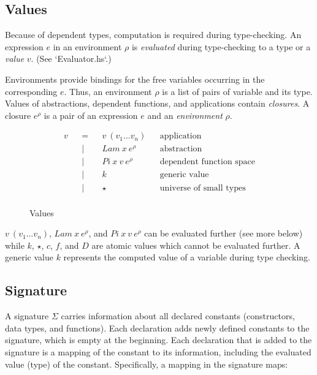 \documentclass[acmsmall]{acmart}
\begin{document}
\subsection{Values}

Because of dependent types, computation is required during type-checking. An
expression $e$ in an environment $\rho$ is \textit{evaluated} during type-checking to a type or a \textit{value} $v$. (See `Evaluator.hs`.)

Environments provide bindings for the free variables occurring in the
corresponding $e$. Thus, an environment $\rho$ is a list of pairs of variable and its type. Values of abstractions, dependent functions, and applications contain \textit{closures}. A closure \textbf{$e^{\rho}$} is a pair of an expression $e$ and an
\textit{environment} \textbf{$\rho$}.

\begin{figure}[H]
  \begin{equation*}
    \label{eq:values}
    \begin{aligned}
      v &  & = &  & v \: (v_1 \dots v_n)     &  & \textrm{application}              \\
        &  & | &  & Lam \: x \: e^{\rho}     &  & \textrm{abstraction}              \\
        &  & | &  & Pi \: x \: v \: e^{\rho} &  & \textrm{dependent function space} \\
        &  & | &  & k                        &  & \textrm{generic value}            \\
        &  & | &  & \star                    &  & \textrm{universe of small types}  \\
    \end{aligned}
  \end{equation*}
  \caption{Values}
\end{figure}

$v \: (v_1 \dots v_n)$, $Lam \: x \: e^{\rho}$, and $Pi \: x \: v \: e^{\rho}$
can be evaluated further (see more below) while $k$, $\star$, $c$, $f$, and $D$ are atomic values
which cannot be evaluated further. A generic value $k$ represents the computed value of a variable during type
checking.

\subsection{Signature}
A signature $\Sigma$ carries information about all declared constants (constructors, data types, and functions). Each declaration adds newly defined constants to the signature, which is empty at the beginning. Each declaration that is added to the signature is a mapping of the constant to its information, including the evaluated value (type) of the constant. Specifically, a mapping in the signature maps:
\end{document}
